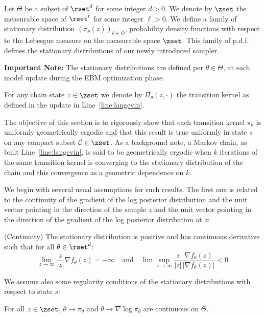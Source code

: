 \documentclass{article}
\begin{document}
Let $\Theta$ be a subset of $\rset^d$ for some integer $d >0$.
We denote by $\zset$ the measurable space of $\rset^\ell$ for some integer $\ell >0$.
We define a family of stationary distribution $\left(\pi_\theta(z) \right)_{\theta \in \Theta}$, probability density functions with respect to the Lebesgue measure on the measurable space $\zset$. This family of p.d.f. defines the stationary distributions of our newly introduced sampler.

\textbf{Important Note:} The stationary distributions are defined per $\theta \in \Theta$, \ie at each model update during the EBM optimization phase.

For any chain state $z \in \zset$ we denote by $\Pi_\theta(z,\cdot)$ the transition kernel as defined in the \algo update in Line~\ref{line:langevin}.

The objective of this section is to rigorously show that each transition kernel $\pi_\theta$ is uniformly geometrically ergodic and that this result is true uniformly in state $s$ on any compact subset $\mathcal{C} \in \zset$.
As a background note, a Markov chain, as built Line~\ref{line:langevin}, is said to be geometrically ergodic when $k$ iterations of the same transition kernel is converging to the stationary distribution of the chain and this convergence as a geometric dependence on $k$.

We begin with several usual assumptions for such results.
The first one is related to the continuity of the gradient of the log posterior distribution and the unit vector pointing in the direction of the sample $z$ and the unit vector pointing in the direction of the gradient of the log posterior distribution at $z$:
\begin{assumption}\label{ass:bounded}
(Continuity) The stationary distribution is positive and has continuous derivative such that for all $\theta \in \rset^d$:
\begin{equation}
\lim \limits_{z \to \infty} \frac{z}{|z|} \nabla f_{\theta}(z) = - \infty \quad \textrm{and} \quad \lim \sup \limits_{z \to \infty} \frac{z}{|z|} \frac{\nabla f_{\theta}(z) }{|\nabla f_{\theta}(z) |} < 0
\end{equation}
\end{assumption}

We assume also some regularity conditions of the stationary distributions with respect to state $s$:
\begin{assumption}\label{ass:contlogpi}
For all $z \in \zset$, $\theta \to \pi_\theta$ and $\theta \to \nabla \log \pi_\theta$ are continuous on $\Theta$.
\end{assumption}
\end{document}

